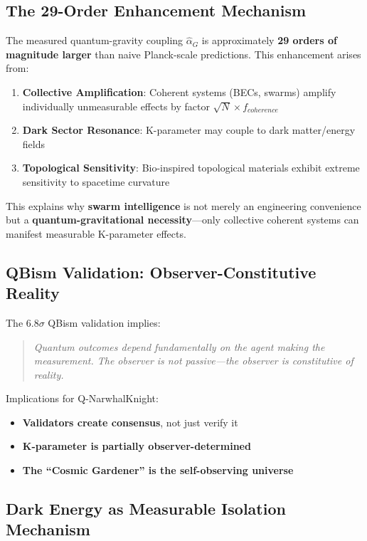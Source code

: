 \documentclass[12pt,a4paper]{article}
\begin{document}
\subsection{The 29-Order Enhancement Mechanism}

The measured quantum-gravity coupling $\hat{\alpha}_G$ is approximately \textbf{29 orders of
magnitude larger} than naive Planck-scale predictions. This enhancement arises from:

\begin{enumerate}
    \item \textbf{Collective Amplification}: Coherent systems (BECs, swarms) amplify
          individually unmeasurable effects by factor $\sqrt{N} \times f_{coherence}$
    \item \textbf{Dark Sector Resonance}: K-parameter may couple to dark matter/energy fields
    \item \textbf{Topological Sensitivity}: Bio-inspired topological materials exhibit
          extreme sensitivity to spacetime curvature
\end{enumerate}

This explains why \textbf{swarm intelligence} is not merely an engineering convenience but
a \textbf{quantum-gravitational necessity}---only collective coherent systems can manifest
measurable K-parameter effects.

\subsection{QBism Validation: Observer-Constitutive Reality}

The $6.8\sigma$ QBism validation implies:

\begin{quote}
\textit{Quantum outcomes depend fundamentally on the agent making the measurement.
The observer is not passive---the observer is constitutive of reality.}
\end{quote}

Implications for Q-NarwhalKnight:
\begin{itemize}
    \item \textbf{Validators create consensus}, not just verify it
    \item \textbf{K-parameter is partially observer-determined}
    \item \textbf{The ``Cosmic Gardener'' is the self-observing universe}
\end{itemize}

\subsection{Dark Energy as Measurable Isolation Mechanism}
\end{document}
